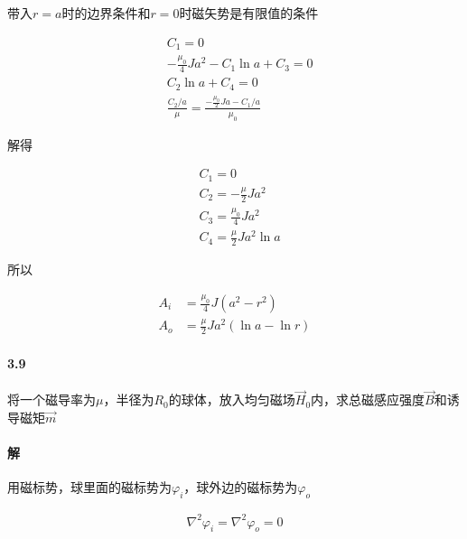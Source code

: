 \documentclass{article}
\begin{document}
带入$r=a$时的边界条件和$r=0$时磁矢势是有限值的条件

\begin{equation*}
  \begin{aligned}
    & C_1 = 0 \\
    & - \frac{\mu_0}{4} J a^2 - C_1 \ln a + C_3 = 0 \\
    & C_2 \ln a + C_4 = 0 \\
    & \frac{C_2 / a}{\mu} = \frac{- \frac{\mu_0}{2} J a - C_1 / a}{\mu_{0}}
  \end{aligned}
\end{equation*}

解得

\begin{equation*}
  \begin{aligned}
    & C_1 = 0 \\
    & C_2 = - \frac{\mu}{2} J a^2 \\
    & C_3 = \frac{\mu_{0}}{4} J a^2 \\
    & C_4 = \frac{\mu}{2} J a^2 \ln a
  \end{aligned}
\end{equation*}

所以

\begin{equation*}
  \begin{aligned}
    A_i &= \frac{\mu_{0}}{4} J \left( a^2 - r^2 \right) \\
    A_o &= \frac{\mu}{2} J a^2 \left( \ln a - \ln r \right)
  \end{aligned}
\end{equation*}

\paragraph{3.9}

将一个磁导率为$\mu$，半径为$R_0$的球体，放入均匀磁场$\vec{H}_0$内，求总磁感应强度$\vec{B}$和诱导磁矩$\vec{m}$

\paragraph{解}

用磁标势，球里面的磁标势为$\varphi_i$，球外边的磁标势为$\varphi_o$

\begin{equation*}
  \begin{aligned}
    \nabla^2 \varphi_i = \nabla^2 \varphi_o = 0
  \end{aligned}
\end{equation*}
\end{document}
